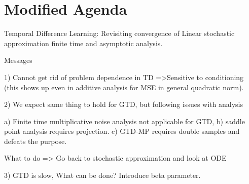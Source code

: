 \section{Modified Agenda}
Temporal Difference Learning: Revisiting convergence of Linear stochastic approximation finite time and asymptotic analysis.

Messages

1) Cannot get rid of problem dependence in TD =>Sensitive to conditioning (this shows up even in additive analysis for MSE in general quadratic norm). 

2) We expect same thing to hold for GTD, but following issues with analysis

a) Finite time multiplicative noise analysis not applicable for GTD, 
b) saddle point analysis requires projection. 
c) GTD-MP requires double samples and defeats the purpose.

What to do => Go back to stochastic approximation and look at ODE

3) GTD is slow, What can be done? Introduce beta parameter. 


